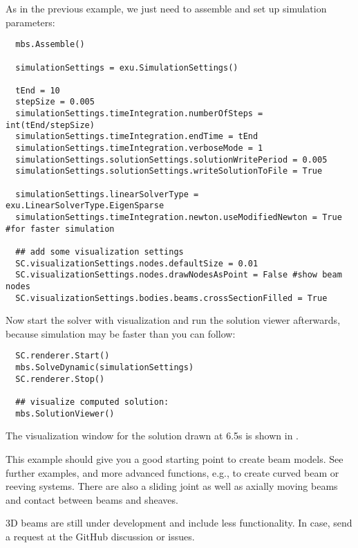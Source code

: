 \noindent As in the previous example, we just need to assemble and set up simulation parameters:
\pythonstyle\begin{lstlisting}
  mbs.Assemble()

  simulationSettings = exu.SimulationSettings()
      
  tEnd = 10
  stepSize = 0.005
  simulationSettings.timeIntegration.numberOfSteps = int(tEnd/stepSize)
  simulationSettings.timeIntegration.endTime = tEnd
  simulationSettings.timeIntegration.verboseMode = 1
  simulationSettings.solutionSettings.solutionWritePeriod = 0.005
  simulationSettings.solutionSettings.writeSolutionToFile = True

  simulationSettings.linearSolverType = exu.LinearSolverType.EigenSparse
  simulationSettings.timeIntegration.newton.useModifiedNewton = True #for faster simulation

  ## add some visualization settings
  SC.visualizationSettings.nodes.defaultSize = 0.01
  SC.visualizationSettings.nodes.drawNodesAsPoint = False #show beam nodes
  SC.visualizationSettings.bodies.beams.crossSectionFilled = True
\end{lstlisting}

\noindent Now start the solver with visualization and run the solution viewer afterwards,
because simulation may be faster than you can follow:
\pythonstyle\begin{lstlisting}
  SC.renderer.Start()
  mbs.SolveDynamic(simulationSettings)
  SC.renderer.Stop()

  ## visualize computed solution:
  mbs.SolutionViewer()
\end{lstlisting}

\noindent The visualization window for the solution drawn at 6.5s is shown in .
%
%

\noindent This example should give you a good starting point to create beam models.
See further examples, and more advanced functions, e.g., to create curved beam or reeving systems.
There are also a sliding joint as well as axially moving beams and contact between beams and sheaves.

\noindent 3D beams are still under development and include less functionality. In case, send a request at the GitHub discussion or issues.

